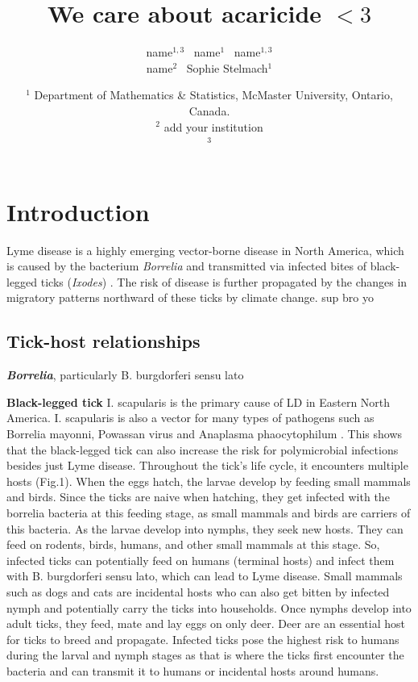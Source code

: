 \documentclass[12pt, centerh1]{article}
\title{We care about acaricide $<3$}
\author{\qquad name$^{1,3}$ \qquad\  name$^{1}$ \qquad\  name$^{1,3}$ \\  name$^{2}$ \quad\ Sophie Stelmach$^{1}$}
\date{{\small $^1$ Department of Mathematics \& Statistics, McMaster University, Ontario, Canada.\\[-6pt]
$^2$ add your institution\\[-6pt]
$^3$ \\[-6pt]
}
}
\begin{document}
\maketitle



\section{Introduction}
Lyme disease is a highly emerging vector-borne disease in North America, which is caused by the bacterium \textit{Borrelia} and transmitted via infected bites of black-legged ticks (\textit{Ixodes}) \citep{govcan}. The risk of disease is further propagated by the changes in migratory patterns northward of these ticks by climate change.
sup bro yo
\subsection{Tick-host relationships}
\textbf{\textit{Borrelia}}, particularly B. burgdorferi sensu lato

\textbf{Black-legged tick}
I. scapularis is the primary cause of LD in Eastern North America. I. scapularis is also a vector for many types of pathogens such as Borrelia mayonni, Powassan virus and Anaplasma phaocytophilum \citep{paulson2023multiomics}. This shows that the black-legged tick can also increase the risk for polymicrobial infections besides just Lyme disease. Throughout the tick's life cycle, it encounters multiple hosts (Fig.1). When the eggs hatch, the larvae develop by feeding small mammals and birds. Since the ticks are naive when hatching, they get infected with the borrelia bacteria at this feeding stage, as small mammals and birds are carriers of this bacteria. As the larvae develop into nymphs, they seek new hosts. They can feed on rodents, birds, humans, and other small mammals at this stage. So, infected ticks can potentially feed on humans (terminal hosts) and infect them with B. burgdorferi sensu lato, which can lead to Lyme disease. Small mammals such as dogs and cats are incidental hosts who can also get bitten by infected nymph and potentially carry the ticks into households. Once nymphs develop into adult ticks, they feed, mate and lay eggs on only deer. Deer are an essential host for ticks to breed and propagate. Infected ticks pose the highest risk to humans during the larval and nymph stages as that is where the ticks first encounter the bacteria and can transmit it to humans or incidental hosts around humans. 
\end{document}
